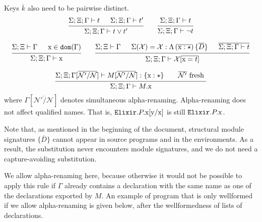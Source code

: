 \documentclass[12pt]{article}
\newcommand{\tx}{\text{\rm x}}
\newcommand{\ty}{\text{\rm y}}
\newcommand{\BX}{\ensuremath{\mathcal{X}}}
\newcommand{\Next}{\ensuremath{\mathcal{N}}}
\newcommand{\Gammatop}{\ensuremath{\Xi}}
\newcommand{\Gammabot}{\ensuremath{\Gamma}}
\newcommand{\dom}{\texttt{dom}}
\newcommand{\Elixir}{\texttt{Elixir}}
\begin{document}
Keys $\overline{k}$ also need to be pairwise distinct. \\

\[
    \begin{prooftree}
        \hypo{ \Sigma; \Gammatop; \Gammabot \vdash t }
        \hypo{ \Sigma; \Gammatop; \Gammabot \vdash t' }
        \infer2{ \Sigma; \Gammatop; \Gammabot \vdash  t \vee  t' }
    \end{prooftree}
    \qquad
    \begin{prooftree}
        \hypo{ \Sigma; \Gammatop; \Gammabot \vdash t }
        \infer1{ \Sigma; \Gammatop; \Gammabot \vdash  \lnot t }
    \end{prooftree}
\]

\[
    \begin{prooftree}
        \hypo{  \Sigma; \Gammatop \vdash \Gammabot }
        \hypo{ \tx \in \dom(\Gammabot) }
        \infer2{ \Sigma; \Gammatop; \Gammabot \vdash \tx }
    \end{prooftree}
    \qquad
    \begin{prooftree}
        \hypo {  \Sigma; \Gammatop \vdash \Gammabot }
        \hypo { \Sigma(\BX) = \BX : \Lambda \left( \overline{\tx : \star} \right) \{\overline D \}}
        \hypo { \overline { \Sigma; \Gammatop; \Gammabot \vdash t} }
        \infer3{  \Sigma; \Gammatop; \Gammabot \vdash \BX [\overline{\tx = t}]  }
    \end{prooftree}
\]

\[
    \begin{prooftree}
        \hypo{ \Sigma; \Gammatop; \Gammabot[\overline{\Next'/\Next}] \vdash M[\overline{\Next'/\Next}] : \{ \tx : \star \} \qquad \overline{\Next'} \text{ fresh } }
        \infer1{ \Sigma; \Gammatop; \Gammabot \vdash M.\tx }
    \end{prooftree}
\]
where $\Gammabot[\overline{\Next'/\Next}]$ denotes simultaneous alpha-renaming.
Alpha-renaming does not affect qualified names. That is, $\Elixir.P.\tx[\ty/\tx]$ is still $\Elixir.P.\tx$.

Note that, as mentioned in the beginning of the document,
structural module signatures $\{ \overline{D} \}$ cannot appear
in source programs and in the environments.
As a result, the substitution never encounters module signatures, and
we do not need a capture-avoiding substitution.

We allow alpha-renaming here, because otherwise it would not be possible to
apply this rule if $\Gammabot$ already contains a declaration with the same name
as one of the declarations exported by $M$. An example of program that is only
wellformed if we allow alpha-renaming is given below, after the wellformedness of lists of declarations.
\end{document}

